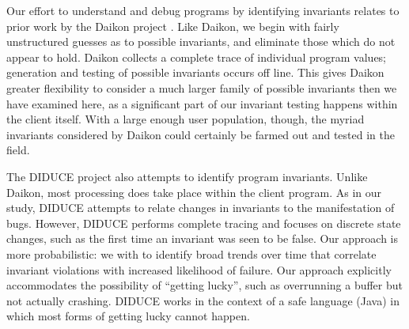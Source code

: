 Our effort to understand and debug programs by identifying invariants
relates to prior work by the Daikon project \cite{ernst2001}.  Like
Daikon, we begin with fairly unstructured guesses as to possible
invariants, and eliminate those which do not appear to hold.  Daikon
collects a complete trace of individual program values; generation and
testing of possible invariants occurs off line.  This gives Daikon
greater flexibility to consider a much larger family of possible
invariants then we have examined here, as a significant part of our
invariant testing happens within the client itself.  With a large
enough user population, though, the myriad invariants considered by
Daikon could certainly be farmed out and tested in the field.

The DIDUCE project \cite{Hangal:DIDUCE:2002} also attempts to identify
program invariants.  Unlike Daikon, most processing does take place
within the client program.  As in our study, DIDUCE attempts to relate
changes in invariants to the manifestation of bugs.  However, DIDUCE
performs complete tracing and focuses on discrete state changes, such
as the first time an invariant was seen to be false.  Our approach is
more probabilistic: we with to identify broad trends over time that
correlate invariant violations with increased likelihood of failure.
Our approach explicitly accommodates the possibility of ``getting
lucky'', such as overrunning a buffer but not actually crashing.
DIDUCE works in the context of a safe language (Java) in which most
forms of getting lucky cannot happen.
